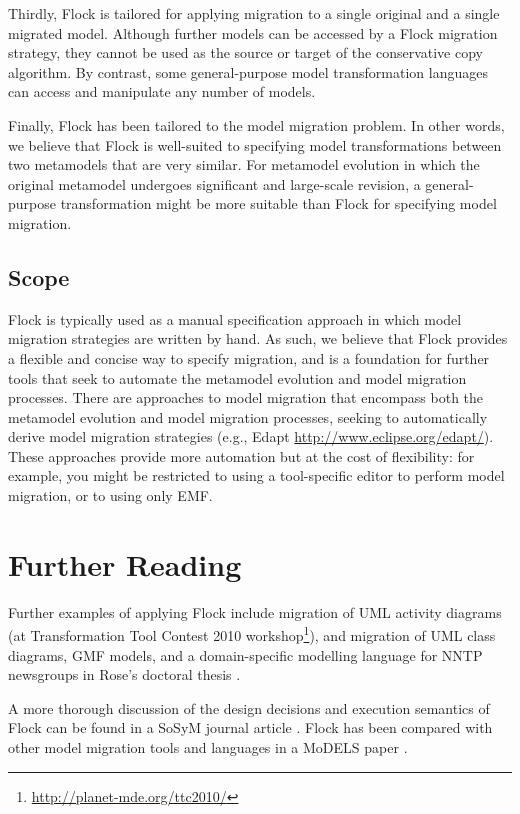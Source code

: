 Thirdly, Flock is tailored for applying migration to a single original and a single migrated model. Although further models can be accessed by a Flock migration strategy, they cannot be used as the source or target of the conservative copy algorithm. By contrast, some general-purpose model transformation languages can access and manipulate any number of models.

Finally, Flock has been tailored to the model migration problem. In other words, we believe that Flock is well-suited to specifying model transformations between two metamodels that are very similar. For metamodel evolution in which the original metamodel undergoes significant and large-scale revision, a general-purpose transformation might be more suitable than Flock for specifying model migration.

\subsection{Scope}
Flock is typically used as a manual specification approach in which model migration strategies are written by hand. As such, we believe that Flock provides a flexible and concise way to specify migration, and is a foundation for further tools that seek to automate the metamodel evolution and model migration processes. There are approaches to model migration that encompass both the metamodel evolution and model migration processes, seeking to automatically derive model migration strategies (e.g., Edapt \url{http://www.eclipse.org/edapt/}). These approaches provide more automation but at the cost of flexibility: for example, you might be restricted to using a tool-specific editor to perform model migration, or to using only EMF.


\section{Further Reading}
Further examples of applying Flock include migration of UML activity diagrams (at Transformation Tool Contest 2010 workshop\footnote{\url{http://planet-mde.org/ttc2010/}}), and migration of UML class diagrams, GMF models, and a domain-specific modelling language for NNTP newsgroups in Rose's doctoral thesis \cite{rose11thesis}.

A more thorough discussion of the design decisions and execution semantics of Flock can be found in a SoSyM journal article \cite{rose12flock}. Flock has been compared with other model migration tools and languages in a MoDELS paper \cite{rose10comparison}. 